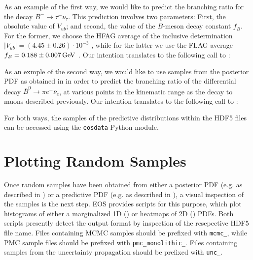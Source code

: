 As an example of the first way, we would like to predict the branching
ratio for the decay $B^- \to \tau^- \bar{\nu}_\tau$. This prediction involves
two parameters: First, the absolute value of $V_{ub}$; and second, the value
of the $B$-meson decay constant $f_{B}$. For the former, we choose the
HFAG average of the inclusive determination $|V_{ub}| = (4.45 \pm 0.26) \cdot 10^{-3}$
\cite{Amhis:2014hma}, while for the latter we use the FLAG average
$f_{B} = 0.188 \pm 0.007\,\mathrm{GeV}$ \cite{Aoki:2013ldr}.
Our intention translates to the following call to :

As an exmple of the second way, we would like to use samples from the posterior
PDF as obtained in  in order to predict the
branching ratio of the differential decay $\bar{B}^0\to \pi e^- \bar{\nu}_e$, at various
points in the kinematic range as the decay to muons described previously.
Our intention translates to the following call to :

For both ways, the samples of the predictive distributions within the HDF5 files
can be accessed using the \texttt{eosdata} Python module.

\section{Plotting Random Samples}
\label{sec:usage:eos-plot}

Once random samples have been obtained from either a posterior PDF (e.g. as
described in ) or a predictive PDF (e.g. as
described in ), a visual inspection of
the samples is the next step.  EOS provides scripts for this purpose, which
plot histograms of either a marginalized 1D () or heatmaps
of 2D () PDFs.  Both scripts presently detect the output
format by inspection of the resepective HDF5 file name. Files containing MCMC
samples should be prefixed with \texttt{mcmc\_}, while PMC sample files should
be prefixed with \texttt{pmc\_monolithic\_}. Files containing samples from the
uncertainty propagation should be prefixed with \texttt{unc\_}.

